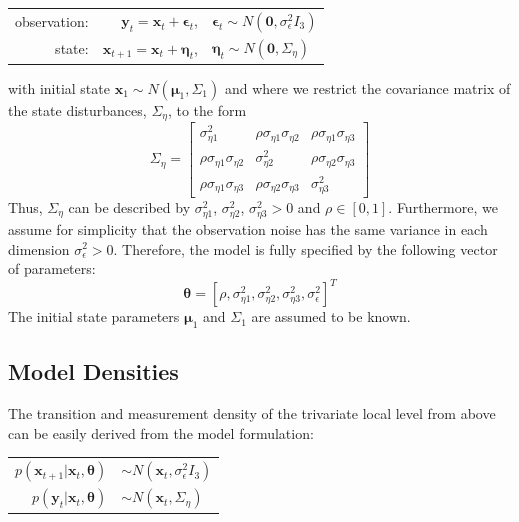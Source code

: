 \documentclass[11pt, oneside]{scrreprt}   	%
\begin{document}
\bigskip
\begin{center}
\begin{tabular}{ r r l }
  observation: & $\boldsymbol{y}_t = \boldsymbol{x}_t + \boldsymbol{\epsilon}_t$, & $\boldsymbol{\epsilon}_t \sim N(\textbf{0}, \sigma_{\epsilon}^2 I_3)$ \\
  state: & $\boldsymbol{x}_{t+1} = \boldsymbol{x}_t + \boldsymbol{\eta}_t$, & $\boldsymbol{\eta}_t \sim N(\textbf{0}, \Sigma_{\eta})$ \\
\end{tabular}
\end{center}
\bigskip
with initial state $\boldsymbol{x}_1 \sim N(\boldsymbol{\mu}_1, \Sigma_1)$ and where we restrict the covariance matrix of the state disturbances, $\Sigma_{\eta}$, to the form
$$
\Sigma_{\eta} = 
\begin{bmatrix}
\sigma_{\eta 1}^2 & \rho \sigma_{\eta 1} \sigma_{\eta 2} & \rho \sigma_{\eta 1} \sigma_{\eta 3}
\\ \rho \sigma_{\eta 1} \sigma_{\eta 2} & \sigma_{\eta 2}^2 & \rho \sigma_{\eta 2} \sigma_{\eta 3}
\\ \rho \sigma_{\eta 1} \sigma_{\eta 3} & \rho \sigma_{\eta 2} \sigma_{\eta 3} & \sigma_{\eta 3}^2
\end{bmatrix}
$$
Thus, $\Sigma_{\eta}$ can be described by $\sigma_{\eta 1}^2$, $\sigma_{\eta 2}^2$, $\sigma_{\eta 3}^2 > 0$ and $\rho \in [0,1]$. Furthermore, we assume for simplicity that the observation noise has the same variance in each dimension $\sigma_{\epsilon}^2 > 0$. Therefore, the model is fully specified by the following vector of parameters:
$$
\boldsymbol{\theta} = [\rho, \sigma_{\eta 1}^2, \sigma_{\eta 2}^2, \sigma_{\eta 3}^2, \sigma_{\epsilon}^2]^T
$$
The initial state parameters $\boldsymbol{\mu}_1$ and $\Sigma_1$ are assumed to be known.

\subsection{Model Densities}
The transition and measurement density of the trivariate local level from above can be easily derived from the model formulation:
\begin{center}
\begin{tabular}{ r l }
  $p(\boldsymbol{x}_{t+1} | \boldsymbol{x}_t, \boldsymbol{\theta})$ & $\sim N(\boldsymbol{x}_t, \sigma_{\epsilon}^2 I_3)$ \\
  $p(\boldsymbol{y}_t | \boldsymbol{x}_t, \boldsymbol{\theta})$ & $\sim N(\boldsymbol{x}_t, \Sigma_{\eta})$ \\
\end{tabular}
\end{center}
\end{document}
